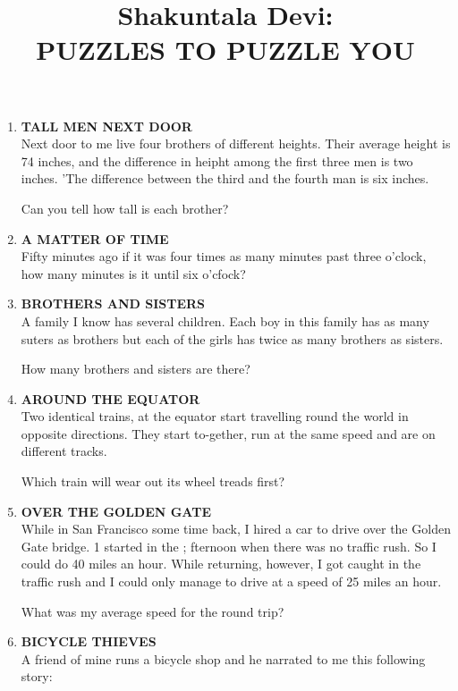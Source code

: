\documentclass[12pt]{article}
\title{Shakuntala Devi: \\
PUZZLES TO PUZZLE YOU}
\author{}
\date{}
\begin{document}
\maketitle

\begin{enumerate}

\item \textbf{TALL  MEN  NEXT  DOOR} \\
Next  door  to me live four  brothers  of different  heights. Their  average  height  is 74 inches,  and the difference  in heipht  among  the  first  three  men  is two  inches. 'The difference  between  the  third  and  the  fourth  man  is six inches. 

Can you tell how  tall is each  brother? 
%
%
\item \textbf{A  MATTER  OF  TIME} \\
Fifty  minutes  ago if it was  four  times  as many  minutes past three  o'clock,  how  many  minutes  is it until  six o'cfock? 
%
\item  \textbf {BROTHERS  AND  SISTERS} \\
A family I know  has several children. Each  boy  in this family  has  as many  suters  as brothers  but each  of the girls  has twice  as many  brothers  as sisters. 

How  many  brothers  and sisters  are there?
%
%
\item \textbf{AROUND  THE  EQUATOR} \\
Two identical  trains,  at the  equator  start  travelling round  the  world  in opposite  directions.  They  start  to-gether,  run  at the  same  speed  and  are  on  different tracks. 

Which  train  will  wear  out its wheel  treads  first? 
%
\item \textbf{OVER  THE  GOLDEN  GATE} \\
While  in San  Francisco  some  time  back,  I hired  a car to drive  over  the  Golden  Gate  bridge.  1 started  in the ; fternoon  when  there  was  no traffic  rush.  So  I could  do 40 miles  an hour.  While  returning,  however, I got caught  in the traffic  rush  and  I could  only  manage to drive  at a speed  of 25 miles  an hour. 

What  was  my average  speed  for the round  trip? 
%
\item  \textbf{BICYCLE  THIEVES} \\
A friend  of mine  runs  a bicycle  shop  and he narrated to me this following  story: 


\end{enumerate}
\end{document}
